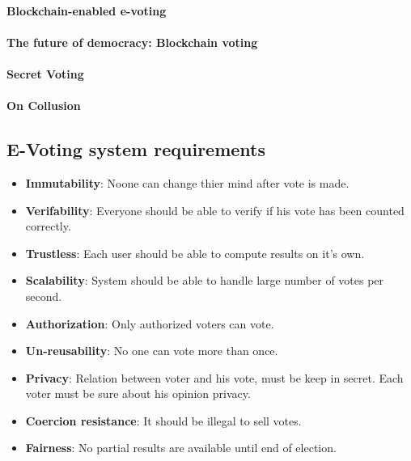 \documentclass[runningheads]{llncs}
\begin{document}
\paragraph{Blockchain-enabled e-voting ~\cite{kshetri2018blockchain} }

\paragraph{The future of democracy: Blockchain voting ~\cite{osgood2016future}}

\paragraph{Secret Voting ~\cite{tam_2018} }

\paragraph{On Collusion ~\cite{buterin_2019} }

\subsection{E-Voting system requirements}
\begin{itemize}
\item \textbf{Immutability}: Noone can change thier mind after vote is made.
\item \textbf{Verifability}: Everyone should be able to verify if his vote has been counted correctly.
\item \textbf{Trustless}: Each user should be able to compute results on it's own.
\item \textbf{Scalability}: System should be able to handle large number of votes per second.
\item \textbf{Authorization}: Only authorized voters can vote.
\item \textbf{Un-reusability}: No one can vote more than once.
\item \textbf{Privacy}: Relation between voter and his vote, must be keep in secret. Each voter must be sure about his opinion privacy. 
\item \textbf{Coercion resistance}: It should be illegal to sell votes.

\item \textbf{Fairness}: No partial results are available until end of election.
\end{itemize}

\end{document}
